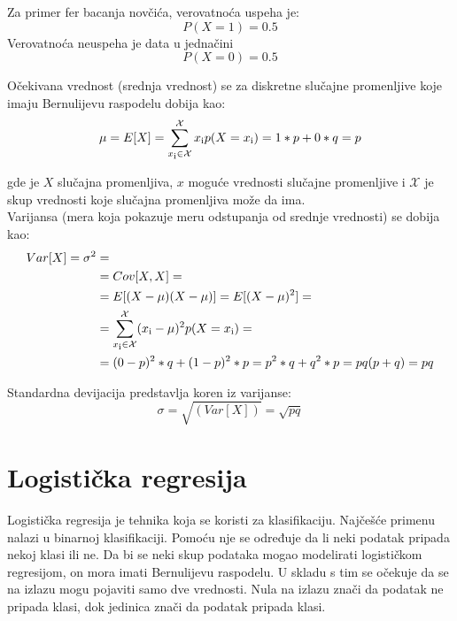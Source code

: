 \documentclass[a4paper,12pt]{report}
\begin{document}
Za primer fer bacanja novčića, verovatnoća uspeha je:
  \begin{equation}
	 P(X = 1) = 0.5 
 \end{equation}
Verovatnoća neuspeha je data u jednačini
  \begin{equation}
	 P(X = 0) = 0.5 
 \end{equation}
 
Očekivana vrednost (srednja vrednost) se za diskretne slučajne promenljive koje imaju Bernulijevu raspodelu dobija kao:  
   \begin{equation}
	 \mu = E[X] = \sum_{x\textsubscript{i} \in \mathcal{X}}^{\mathcal{X}} x\textsubscript{i} p(X = x\textsubscript{i}) = 1 * p + 0 * q = p
 \end{equation}

gde je $X$ slučajna promenljiva, $x$ moguće vrednosti slučajne promenljive i $\mathcal{X}$ je skup vrednosti koje slučajna promenljiva može da ima.\\

Varijansa (mera koja pokazuje meru odstupanja od srednje vrednosti) se dobija kao:
\begin{equation}
\begin{split}
Var[X] = \sigma^2 & =  \\
& = Cov[X, X] = \\
& = E[(X - \mu)(X - \mu)] = E[(X - \mu)^2] = \\ 
& = \sum_{x\textsubscript{i} \in \mathcal{X}}^{\mathcal{X}} (x\textsubscript{i} - \mu)^2 p(X = x\textsubscript{i}) = \\
& = (0 - p)^2 * q + (1 - p)^2 * p = p^2*q +  q^2*p = pq (p + q) = pq
 \end{split}
 \end{equation}
 
Standardna devijacija predstavlja koren iz varijanse:
\begin{equation}
\sigma = \sqrt{(Var[X])} = \sqrt{pq}
\end{equation}

\section{Logistička regresija}

Logistička regresija je tehnika koja se koristi za klasifikaciju. Najčešće primenu nalazi u binarnoj klasifikaciji. Pomoću nje se određuje da li neki podatak pripada nekoj klasi ili ne. Da bi se neki skup podataka mogao modelirati logističkom regresijom, on mora imati Bernulijevu raspodelu. U skladu s tim se očekuje da se na izlazu mogu pojaviti samo dve vrednosti. Nula na izlazu znači da podatak ne pripada klasi, dok jedinica znači da podatak pripada klasi. 
\end{document}
